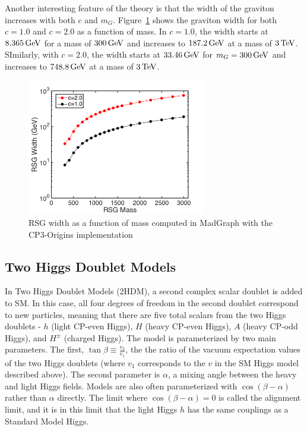 Another interesting feature of the theory is that the width of the graviton increases with both $c$ and $m_G$. Figure~\ref{fig:G_width} shows the graviton width for both $c=1.0$ and $c=2.0$ as a function of mass. In $c=1.0$, the width starts at $8.365 \GeV$ for a mass of $300 \GeV$ and increases to $187.2 \GeV$ at a mass of $3 \TeV$. SImilarly, with $c=2.0$, the width starts at $33.46 \GeV$ for $m_G = 300 \GeV$ and increases to $748.8 \GeV$ at a mass of $3 \TeV$. 

\begin{figure}[h!]
  \centering
  \captionsetup{justification=centering}

  \includegraphics[width=0.7\textwidth]{figures/RSG_width}
   \caption{RSG width as a function of mass computed in MadGraph with the CP3-Origins implementation~\cite{RSG_LHC,MadGraph}}
  \label{fig:G_width}
\end{figure}

\subsection{Two Higgs Doublet Models}

In Two Higgs Doublet Models (2HDM), a second complex scalar doublet is added to SM\cite{HH_2HDM,2HDM2,2HDM3}. In this case, all four degrees of freedom in the second doublet correspond to new particles, meaning that there are five total scalars from the two Higgs doublets - $h$ (light CP-even Higgs), $H$ (heavy CP-even Higgs), $A$ (heavy CP-odd Higgs), and $H^{\pm}$ (charged Higgs). The model is parameterized by two main parameters. The first, $\tan{\beta} \equiv \frac{v_2}{v_1}$, the the ratio of the vacuum expectation values of the two Higgs doublets (where $v_1$ corresponds to the $v$ in the SM Higgs model described above). The second parameter is $\alpha$, a mixing angle between the heavy and light Higgs fields. Models are also often parameterized with $\cos(\beta - \alpha)$ rather than $\alpha$ directly. The limit where $\cos(\beta - \alpha) = 0$ is called the alignment limit, and it is in this limit that the light Higgs $h$ has the same couplings as a Standard Model Higgs. 

